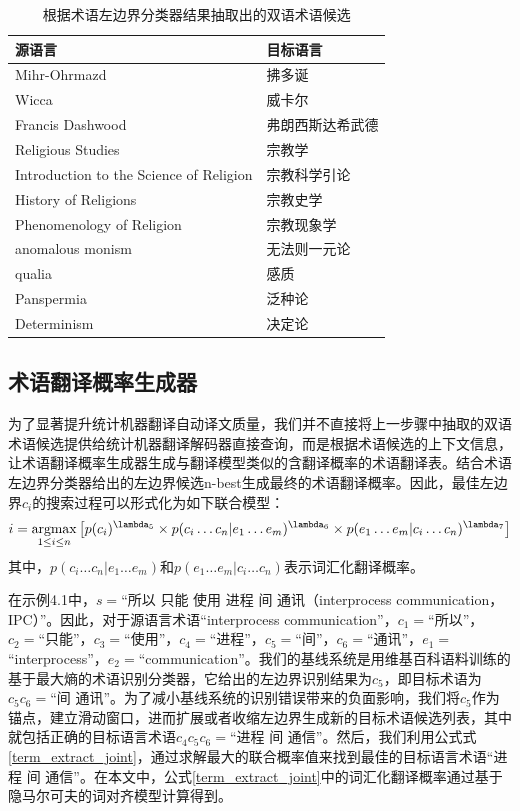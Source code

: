 \begin{table}[!hbt]
	\centering
	\begin{tabular}{l|l}
		\hline
		源语言 & 目标语言     \\ \hline
		Mihr-Ohrmazd & 拂多诞      \\ 
		Wicca & 威卡尔      \\ 
		Francis Dashwood & 弗朗西斯达希武德 \\ 
		Religious Studies & 宗教学      \\ 
		Introduction to the Science of Religion & 宗教科学引论   \\
		History of Religions & 宗教史学     \\ 
		Phenomenology of Religion & 宗教现象学    \\
		anomalous monism & 无法则一元论   \\ 
		qualia & 感质       \\ 
		Panspermia & 泛种论      \\ 
		Determinism & 决定论      \\ \hline
	\end{tabular}
	\caption{根据术语左边界分类器结果抽取出的双语术语候选}
	\label{Table_dict_samples}
\end{table}

\subsection{术语翻译概率生成器}

为了显著提升统计机器翻译自动译文质量，我们并不直接将上一步骤中抽取的双语术语候选提供给统计机器翻译解码器直接查询，而是根据术语候选的上下文信息，让术语翻译概率生成器生成与翻译模型类似的含翻译概率的术语翻译表。结合术语左边界分类器给出的左边界候选n-best生成最终的术语翻译概率。因此，最佳左边界$c_i$的搜索过程可以形式化为如下联合模型：
\begin{equation}\label{term_extract_joint}
i= \argmax_{1 \le i \le n} \left[ p(c_i)^{\lambda_5} \times p(c_i\ldots c_n|e_1\ldots e_m)^{\lambda_6} \times p(e_1\ldots e_m|c_i\ldots c_n)^{\lambda_7} \right]
\end{equation}
其中，$p(c_i\ldots c_n|e_1\ldots e_m)$和$p(e_1\ldots e_m|c_i\ldots c_n)$表示词汇化翻译概率。

在示例4.1中，$s=$“所以 只能 使用 进程 间 通讯（interprocess communication，IPC）”。因此，对于源语言术语“interprocess communication”，$c_1=$“所以”，$c_2=$“只能”，$c_3=$“使用”，$c_4=$“进程”，$c_5=$“间”，$c_6=$“通讯”，$e_1=$“interprocess”，$e_2=$“communication”。我们的基线系统是用维基百科语料训练的基于最大熵的术语识别分类器，它给出的左边界识别结果为$c_5$，即目标术语为$c_5c_6=$“间 通讯”。为了减小基线系统的识别错误带来的负面影响，我们将$c_5$作为锚点，建立滑动窗口，进而扩展或者收缩左边界生成新的目标术语候选列表，其中就包括正确的目标语言术语$c_4c_5c_6=$“进程 间 通信”。然后，我们利用公式式\ref{term_extract_joint}，通过求解最大的联合概率值来找到最佳的目标语言术语“进程 间 通信”。在本文中，公式\ref{term_extract_joint}中的词汇化翻译概率通过基于隐马尔可夫的词对齐模型计算得到。

